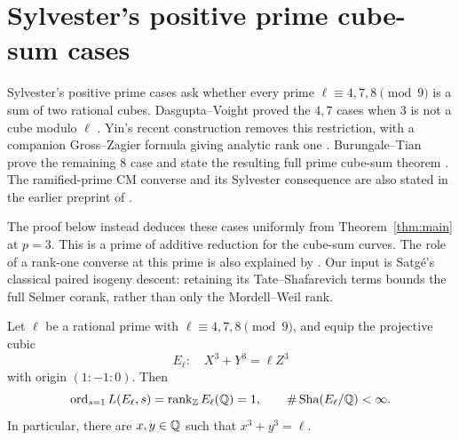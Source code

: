 \section{Sylvester's positive prime cube-sum cases}
\label{sec:sylvester}

Sylvester's positive prime cases ask whether every prime
$\ell\equiv4,7,8\pmod9$ is a sum of two rational cubes.
Dasgupta--Voight proved the $4,7$ cases when $3$ is not a cube modulo
$\ell$ \citep[Theorem~1.2.1]{DasguptaVoight2018}.
Yin's recent construction removes this restriction, with a companion
Gross--Zagier formula giving analytic rank one
\citep{Yin2026Sylvester47,Yin2026SylvesterGZ}.
Burungale--Tian prove the remaining $8$ case and state the resulting
full prime cube-sum theorem
\citep[Theorems~1.1 and~1.2]{BurungaleTian2026Sylvester}.
The ramified-prime CM converse and its Sylvester consequence are also
stated in the earlier preprint of \citet[Theorems~1.1 and~1.3]{Kriz2022}.

The proof below instead deduces these cases uniformly from
Theorem~\ref{thm:main} at $p=3$. This is a prime of additive reduction
for the cube-sum curves. The role of a rank-one converse at this prime
is also explained by
\citet[Section~1.2.2]{BurungaleTian2026Sylvester}.
Our input is Satg\'e's classical paired isogeny descent: retaining
its Tate--Shafarevich terms bounds the full Selmer corank, rather than
only the Mordell--Weil rank.

\begin{corollary}
\label{cor:sylvester}
Let $\ell$ be a rational prime with $\ell\equiv4,7,8\pmod 9$, and equip
the projective cubic
\[
 E_\ell:\quad X^3+Y^3=\ell Z^3
\]
with origin $(1:-1:0)$. Then
\[
 \operatorname{ord}_{s=1}L(E_\ell,s)=\operatorname{rank}_\mathbb Z E_\ell(\mathbb Q)=1,
 \qquad \#\operatorname{Sha}(E_\ell/\mathbb Q)<\infty.
\]
In particular, there are $x,y\in\mathbb Q$ such that $x^3+y^3=\ell$.
\end{corollary}

